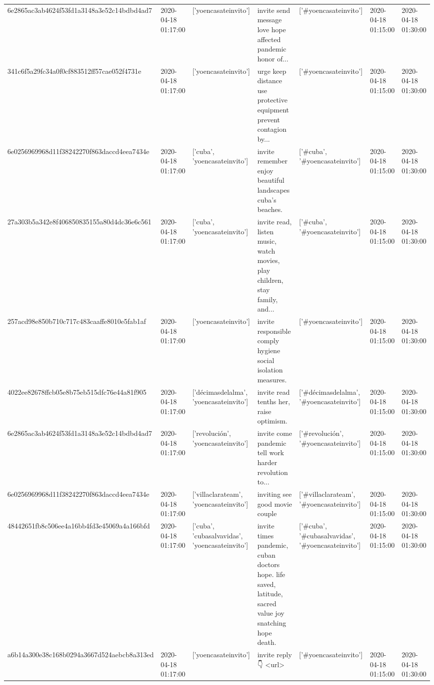 \begin{tabular}{lllllll}
6e2865ac3ab4624f53fd1a3148a3e52c14bdbd4ad7 & 2020-04-18 01:17:00 & ['yoencasateinvito'] & invite send message love hope affected pandemic honor of... & ['#yoencasateinvito'] & 2020-04-18 01:15:00 & 2020-04-18 01:30:00 \\
341c6f5a29fc34a0f0cf883512ff57cae052f4731e & 2020-04-18 01:17:00 & ['yoencasateinvito'] & urge keep distance use protective equipment prevent contagion by... & ['#yoencasateinvito'] & 2020-04-18 01:15:00 & 2020-04-18 01:30:00 \\
6e0256969968d11f38242270f863daccd4eea7434e & 2020-04-18 01:17:00 & ['cuba', 'yoencasateinvito'] & invite remember enjoy beautiful landscapes cuba's beaches. & ['#cuba', '#yoencasateinvito'] & 2020-04-18 01:15:00 & 2020-04-18 01:30:00 \\
27a303b5a342e8f406850835155a80d4dc36e6c561 & 2020-04-18 01:17:00 & ['cuba', 'yoencasateinvito'] & invite read, listen music, watch movies, play children, stay family, and... & ['#cuba', '#yoencasateinvito'] & 2020-04-18 01:15:00 & 2020-04-18 01:30:00 \\
257acd98e850b710c717c483caaffe8010e5fab1af & 2020-04-18 01:17:00 & ['yoencasateinvito'] & invite responsible comply hygiene social isolation measures. & ['#yoencasateinvito'] & 2020-04-18 01:15:00 & 2020-04-18 01:30:00 \\
4022ee82678ffcb05e8b75eb515dfc76e44a81f905 & 2020-04-18 01:17:00 & ['décimasdelalma', 'yoencasateinvito'] & invite read tenths her, raise optimism. & ['#décimasdelalma', '#yoencasateinvito'] & 2020-04-18 01:15:00 & 2020-04-18 01:30:00 \\
6e2865ac3ab4624f53fd1a3148a3e52c14bdbd4ad7 & 2020-04-18 01:17:00 & ['revolución', 'yoencasateinvito'] & invite come pandemic tell work harder revolution to... & ['#revolución', '#yoencasateinvito'] & 2020-04-18 01:15:00 & 2020-04-18 01:30:00 \\
6e0256969968d11f38242270f863daccd4eea7434e & 2020-04-18 01:17:00 & ['villaclarateam', 'yoencasateinvito'] & inviting see good movie couple & ['#villaclarateam', '#yoencasateinvito'] & 2020-04-18 01:15:00 & 2020-04-18 01:30:00 \\
48442651fb8c506ee4a16bb4fd3e45069a4a166bfd & 2020-04-18 01:17:00 & ['cuba', 'cubasalvavidas', 'yoencasateinvito'] & invite times pandemic, cuban doctors hope. life saved, latitude, sacred value joy snatching hope death. & ['#cuba', '#cubasalvavidas', '#yoencasateinvito'] & 2020-04-18 01:15:00 & 2020-04-18 01:30:00 \\
a6b14a300e38c168b0294a3667d524aebcb8a313ed & 2020-04-18 01:17:00 & ['yoencasateinvito'] & invite reply 👇 <url> & ['#yoencasateinvito'] & 2020-04-18 01:15:00 & 2020-04-18 01:30:00 \\

\end{tabular}
